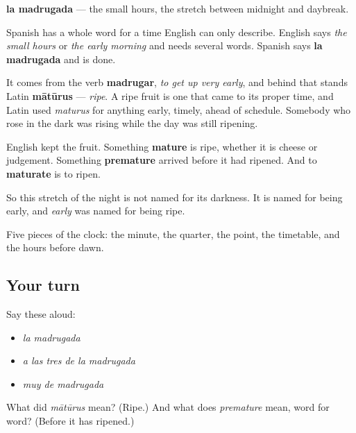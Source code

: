 \begin{cousinweb}
\textbf{la madrugada} — the small hours, the stretch between midnight and daybreak.

Spanish has a whole word for a time English can only describe. English says \emph{the small hours} or \emph{the early morning} and needs several words. Spanish says \textbf{la madrugada} and is done.

It comes from the verb \textbf{madrugar}, \emph{to get up very early}, and behind that stands Latin \textbf{mātūrus} — \emph{ripe}. A ripe fruit is one that came to its proper time, and Latin used \emph{maturus} for anything early, timely, ahead of schedule. Somebody who rose in the dark was rising while the day was still ripening.

English kept the fruit. Something \textbf{mature} is ripe, whether it is cheese or judgement. Something \textbf{premature} arrived before it had ripened. And to \textbf{maturate} is to ripen.

So this stretch of the night is not named for its darkness. It is named for being early, and \emph{early} was named for being ripe.
\end{cousinweb}

\begin{grammarlens}[title={What you've built}]
Five pieces of the clock: the minute, the quarter, the point, the timetable, and the hours before dawn.
\end{grammarlens}

\subsection*{Your turn}
Say these aloud:

\begin{itemize}
\raggedright
  \item \emph{la madrugada}
  \item \emph{a las tres de la madrugada}
  \item \emph{muy de madrugada}
\end{itemize}

\begin{tcolorbox}[breakable,colback=teal!4,colframe=teal!35!black,title={Before you move on}]
What did \emph{mātūrus} mean? (Ripe.) And what does \emph{premature} mean, word for word? (Before it has ripened.)
\end{tcolorbox}
